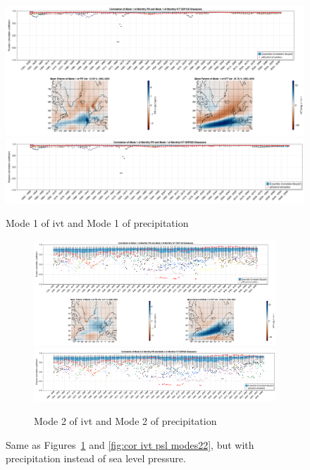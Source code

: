 \begin{figure}[htb]
    \includegraphics[width=.75\textwidth]{figures/correlation_boxplot_pr_ivt_modes11_ssp126_50seasons.png}
    \includegraphics[width=.75\textwidth]{figures/correlation_boxplot_pr_ivt_modes11_ssp585_50seasons.png}
    \caption{Mode 1 of \ac{ivt} and Mode 1 of precipitation}
    \label{fig:cor pr ivt modes11}
\end{figure}


\begin{figure}[!tbp]
  
  \begin{subfigure}[b]{0.49\textwidth}
    \includegraphics[width=\textwidth]{figures/correlation_boxplot_pr_ivt_modes22_ssp126_50seasons.png}
    \includegraphics[width=\textwidth]{figures/correlation_boxplot_pr_ivt_modes22_ssp585_50seasons.png}
    \caption{Mode 2 of \ac{ivt} and Mode 2 of precipitation}
    \label{fig:cor pr ivt modes22}
  \end{subfigure}
  \caption{Same as Figures~\ref{fig:cor pr ivt modes11} and \ref{fig:cor ivt psl modes22}, but with precipitation instead of sea level pressure.}
\end{figure}


